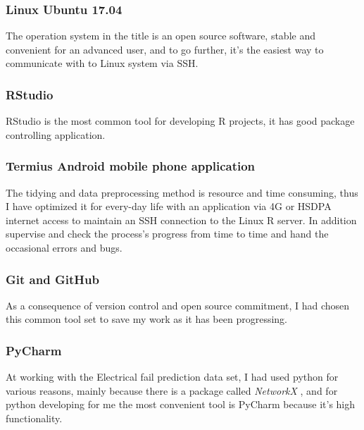 			\subsubsection{Linux Ubuntu 17.04}
The operation system in the title is an open source software, stable and convenient for an advanced user, and to go further, it's the easiest way to communicate with to Linux system via SSH.
\cite{Ubuntu}
			\subsubsection{RStudio}
RStudio is the most common tool for developing R projects, it has good package controlling application.
\cite{RStudio}
			\subsubsection{Termius Android mobile phone application}
The tidying and data preprocessing method is resource and time consuming, thus I have optimized it for every-day life with an application via 4G or HSDPA internet access to maintain an SSH connection to the Linux R server. In addition supervise and check the process's progress from time to time and hand the occasional errors and bugs.
\cite{Termius}
			\subsubsection{Git and GitHub}
As a consequence of version control and open source commitment, I had chosen this common tool set to save my work as it has been progressing.
\cite{Github}
			\subsubsection{PyCharm}
At working with the Electrical fail prediction data set, I had used python for various reasons, mainly because there is a package called \textit{NetworkX} \cite{NetworkX}, and for python developing for me the most convenient tool is PyCharm because it's high functionality.
\cite{PyCharm}	
